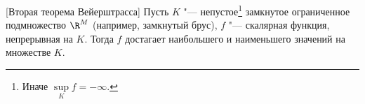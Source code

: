 [Вторая теорема Вейерштрасса]
	 Пусть $K$ "--- непустое\footnote{Иначе $\sup\limits_{K} f = -\infty$.} замкнутое ограниченное подмножество  $\R^M$ (например, замкнутый брус),
	 $f$ "--- скалярная функция, непрерывная на $K$. Тогда $f$ достагает наибольшего и наименьшего значений на множестве $K$.
	 